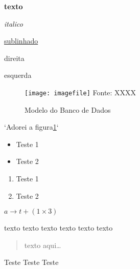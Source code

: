 \vspace{1cm}

\textbf{texto}

\textit{italico}

\underline{sublinhado}

\begin{flushright}
  direita
\end{flushright}

\begin{flushleft}
  esquerda
\end{flushleft}


\begin{figure}[H] %
    \label{figDemo}
    \centering
    \small
    \caption{Modelo do Banco de Dados}
    \texttt{[image: imagefile]}
    Fonte: XXXX
\end{figure}

`Adorei a figura\ref{figDemo}`

\begin{itemize}
  \item Teste 1
  \item Teste 2
\end{itemize}

\begin{enumerate}
  \item Teste 1
  \item Teste 2
\end{enumerate}

$a \rightarrow t + (1 \times 3)$

\tiny texto
\small texto
\large texto
\huge texto
\scriptsize texto
\footnotesize texto

\begin{quotation}
  texto aqui\ldots
\end{quotation}


% 
Teste\cite{chave}
Teste\cite[capítulo, p.~215]{chave}
Teste\citeyear{chave}
